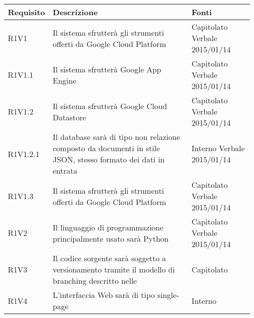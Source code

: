 \begin{center}

	\def\arraystretch{1.5}
	\bgroup
	\begin{longtable}{| p{2cm} | p{8cm} | p{2cm} |}

		\hline
		\textbf{Requisito} & \textbf{Descrizione} & \textbf{Fonti} \\
		\hline

		R1V1  &  Il sistema sfrutterà gli strumenti offerti da Google Cloud Platform  &  Capitolato \newline Verbale 2015/01/14 \\
		\hline
		R1V1.1  &  Il sistema sfrutterà Google App Engine  &  Capitolato \newline Verbale 2015/01/14 \\
		\hline
		R1V1.2  &  Il sistema sfrutterà Google Cloud Datastore  &  Capitolato \newline Verbale 2015/01/14 \\
		\hline
		R1V1.2.1  &  Il database sarà di tipo non relazione composto da documenti in stile JSON, stesso formato dei dati in entrata  &  Interno \newline Verbale 2015/01/14 \\
		\hline
		R1V1.3  &  Il sistema sfrutterà gli strumenti offerti da Google Cloud Platform  &  Capitolato \newline Verbale 2015/01/14 \\
		\hline
		R1V2  &  Il linguaggio di programmazione principalmente usato sarà Python  &  Capitolato \newline Verbale 2015/01/14 \\
		\hline
		R1V3  &  Il codice sorgente sarà soggetto a versionamento tramite il modello di branching descritto nelle \docNameVersionNdP  &  Capitolato \\
		\hline
		R1V4  &  L'interfaccia Web sarà di tipo single-page  &  Interno \\
		\hline

	\end{longtable}
	\egroup
\end{center}

